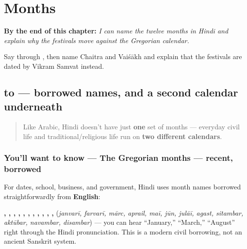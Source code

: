 
\chapter{Months}
\label{ch:hi-months}

\begin{chapteropening}
\textbf{By the end of this chapter:} \emph{I can name the twelve months in Hindi and explain why the festivals move against the Gregorian calendar.}

Say  through , then name Chaitra and Vaiśākh and explain that the festivals are dated by Vikram Samvat instead.
\end{chapteropening}

\section[\texorpdfstring{\hi{जनवरी} \hi{फ़रवरी} \hi{मार्च} … (janvarī farvarī …)}{जनवरी फ़रवरी मार्च … (janvarī farvarī …)}]{ to  — borrowed names, and a second calendar underneath}

\label{lesson:HI-C16-mahine}



\begin{quote}
Like Arabic, Hindi doesn't have just \textbf{one} set of months — everyday civil life and traditional/religious life run on \textbf{two different calendars}.
\end{quote}

\subsection*{You'll want to know — The Gregorian months — recent, borrowed}
For dates, school, business, and government, Hindi uses month names borrowed straightforwardly from \textbf{English}:

\textbf{, , , , , , , , , , , } (\emph{janvarī, farvarī, mārc, aprail, maī, jūn, julāī, agast, sitambar, aktūbar, navambar, disambar}) — you can hear \textquotedblleft{}January,\textquotedblright{} \textquotedblleft{}March,\textquotedblright{} \textquotedblleft{}August\textquotedblright{} right through the Hindi pronunciation. This is a modern civil borrowing, not an ancient Sanskrit system.

